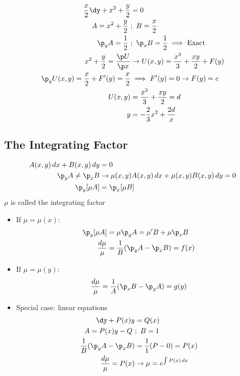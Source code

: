 \documentclass[Maths.tex]{subfiles}
\begin{document}
\begin{example}
    \begin{align}
        \frac{x}{2}\dy + x^2 + \frac{y}{2} &= 0 \\
        A = x^2 + \frac{y}{2} ~&;~ B = \frac{x}{2} \\
        \p_yA = \frac{1}{2} ~&;~ \p_xB = \frac{1}{2} \implies \text{Exact} \\
        x^2 + \frac{y}{2} = \frac{\p U}{\p x} &\to U(x,y) = \frac{x^3}{3} + \frac{xy}{2} + F(y) \\
        \p_yU(x,y) = \frac{x}{2} + F'(y) = \frac{x}{2} &\implies F'(y) = 0 \to F(y) = c \\
        U(x,y) &= \frac{x^3}{3} + \frac{xy}{2} = d \\
        y &= -\frac{2}{3}x^2 + \frac{2d}{x}
    \end{align}
\end{example}

\subsection{The Integrating Factor}
\begin{align}
    A(x,y)\,dx + B(x,y)\,dy &= 0 \\
    \p_yA \neq \p_xB &\to \mu(x,y)A(x,y)\,dx + \mu(x,y)B(x,y)\,dy = 0 \\
    \p_y[\mu A] &= \p_x[\mu B]
\end{align}
$\mu$ is called the integrating factor
\begin{itemize}
    \item If $\mu = \mu(x)$:
        \begin{align}
            \p_y[\mu A] &= \mu \p_yA = \mu'B + \mu\p_xB \\
            \frac{d\mu}{\mu} &= \frac{1}{B}(\p_yA - \p_xB) = f(x)
        \end{align}
    \item If $\mu = \mu(y)$:
        \begin{equation}
            \frac{d\mu}{\mu} = \frac{1}{A}(\p_xB - \p_yA) = g(y)
        \end{equation}
    \item Special case: linear equations
        \begin{align}
            \dy + P(x)y &= Q(x) \\
            A = P(x)y - Q ~&;~ B = 1 \\
            \frac{1}{B}(\p_yA - \p_xB) &= \frac{1}{1}(P - 0) = P(x) \\
            \frac{d\mu}{\mu} = P(x) &\to \mu = e^{\int P(x)\,dx}
        \end{align}
\end{itemize}
\end{document}
